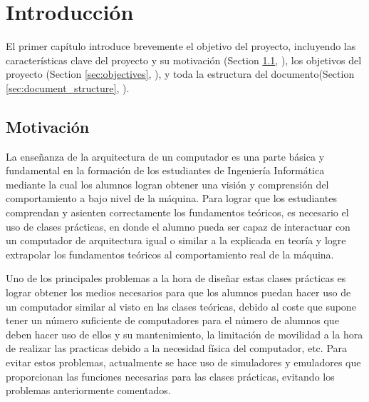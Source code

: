 \chead[]{}
\renewcommand{\headrulewidth}{0.5pt}

\lfoot[]{}
\cfoot[]{}
\rfoot[]{}
\renewcommand{\footrulewidth}{0pt}

\chapter{Introducción}
\label{ch:introduction}

El primer capítulo introduce brevemente el objetivo del proyecto, incluyendo las características clave del proyecto y su motivación (Section \ref{sec:background_and_motivation}, \textit{}), los objetivos del proyecto (Section \ref{sec:objectives}, \textit{}), y toda la estructura del documento(Section \ref{sec:document_structure}, \textit{}).

\section{Motivación}
\label{sec:background_and_motivation}

La enseñanza de la arquitectura de un computador es una parte básica y fundamental en la formación de los estudiantes de Ingeniería Informática mediante la cual los alumnos logran obtener una visión y comprensión del comportamiento a bajo nivel de la máquina. Para lograr que los estudiantes comprendan y asienten correctamente los fundamentos teóricos, es necesario el uso de clases prácticas, en donde el alumno pueda ser capaz de interactuar con un computador de arquitectura igual o similar a la explicada en teoría y logre extrapolar los fundamentos teóricos al comportamiento real de la máquina.

Uno de los principales problemas a la hora de diseñar estas clases prácticas es lograr obtener los medios necesarios para que los alumnos puedan hacer uso de un computador similar al visto en las clases teóricas, debido al coste que supone tener un número suficiente de computadores para el número de alumnos que deben hacer uso de ellos y su mantenimiento, la limitación de movilidad a la hora de realizar las practicas debido a la necesidad física del computador, etc. Para evitar estos problemas, actualmente se hace uso de simuladores y emuladores que proporcionan las funciones necesarias para las clases prácticas, evitando los problemas anteriormente comentados.

